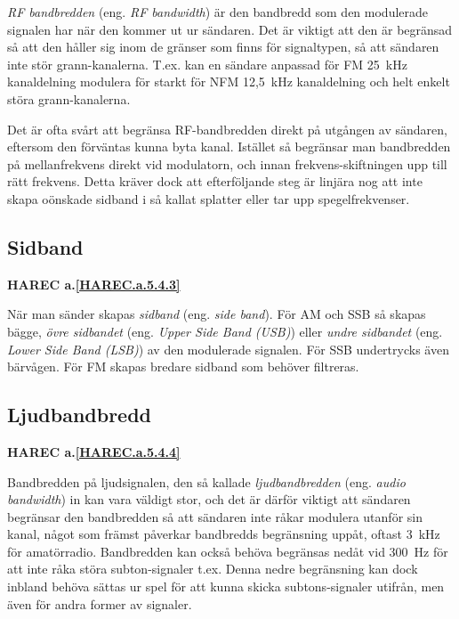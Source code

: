 \emph{RF bandbredden} (eng. \emph{RF bandwidth}) är den bandbredd som den
modulerade signalen har när den kommer ut ur sändaren.
Det är viktigt att den är begränsad så att den håller sig inom de gränser
som finns för signaltypen, så att sändaren inte stör grann-kanalerna.
T.ex. kan en sändare anpassad för FM 25~kHz kanaldelning modulera för starkt för
NFM 12,5~kHz kanaldelning och helt enkelt störa grann-kanalerna.

Det är ofta svårt att begränsa RF-bandbredden direkt på utgången av sändaren,
eftersom den förväntas kunna byta kanal.
Istället så begränsar man bandbredden på mellanfrekvens direkt vid modulatorn,
och innan frekvens-skiftningen upp till rätt frekvens.
Detta kräver dock att efterföljande steg är linjära nog att inte skapa oönskade
sidband i så kallat splatter eller tar upp spegelfrekvenser.

\subsection{Sidband}
\textbf{HAREC
  a.\ref{HAREC.a.5.4.3}\label{myHAREC.a.5.4.3}
}

När man sänder skapas \emph{sidband} (eng. \emph{side band}).
För AM och SSB så skapas bägge, \emph{övre sidbandet}
(eng. \emph{Upper Side Band (USB)}) eller \emph{undre sidbandet}
(eng. \emph{Lower Side Band (LSB)}) av den modulerade signalen.
För SSB undertrycks även bärvågen.
För FM skapas bredare sidband som behöver filtreras.

\subsection{Ljudbandbredd}
\textbf{HAREC
  a.\ref{HAREC.a.5.4.4}\label{myHAREC.a.5.4.4}
}

Bandbredden på ljudsignalen, den så kallade \emph{ljudbandbredden} (eng.
\emph{audio bandwidth}) in kan vara väldigt stor, och det är därför viktigt
att sändaren begränsar den bandbredden så att sändaren inte råkar modulera
utanför sin kanal, något som främst påverkar bandbredds begränsning uppåt,
oftast 3~kHz för amatörradio.
Bandbredden kan också behöva begränsas nedåt vid 300~Hz för att inte råka
störa subton-signaler t.ex.
Denna nedre begränsning kan dock inbland behöva sättas ur spel för att
kunna skicka subtons-signaler utifrån, men även för andra former av signaler.

